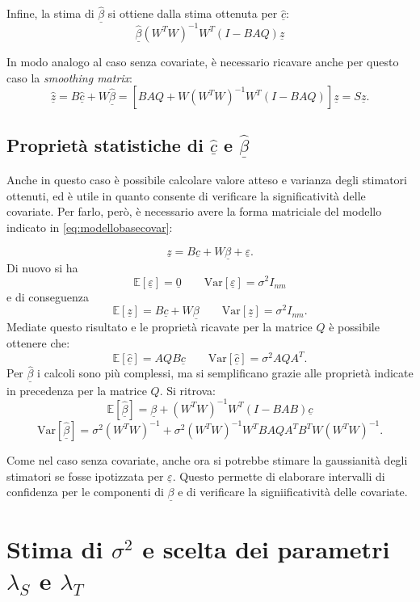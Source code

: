 \documentclass[a4paper,11pt,twoside,openright]{book}							%
\begin{document}
Infine, la stima di $\hat  {\underline \beta}$ si ottiene dalla stima ottenuta per $\hat  {\underline c}$:
$$
\hat{\underline{\beta}}(W^TW)^{-1}W^T(I-B AQ)\underline z
$$

In modo analogo al caso senza covariate, è necessario ricavare anche per questo caso la \textit{smoothing matrix}:
$$
\hat  {\underline z} =B\hat  {\underline c} + W \hat  {\underline \beta} = [B AQ + W(W^TW)^{-1}W^T(I-B AQ)]\underline z = S\underline z .
$$

\subsection{Proprietà statistiche di $\hat  {\underline c}$ e $\hat  {\underline \beta}$}
Anche in questo caso è possibile calcolare valore atteso e varianza degli stimatori ottenuti, ed è utile in quanto consente di verificare la significatività delle covariate. Per farlo, però, è necessario avere la forma matriciale del modello indicato in \ref{eq:modellobasecovar}:

\begin{equation}
\label{eq:modellobasecovarmatric}
\underline z=B \underline c + W \underline \beta + \underline \varepsilon .
\end{equation}
Di nuovo si ha 
$$
\mathbb{E}[\underline \varepsilon] = \underline 0 \qquad \mathrm{Var}[\underline \varepsilon] = \sigma^2 I_{nm}
$$
e di conseguenza
$$
\mathbb{E}[\underline z] = B \underline c + W \underline \beta \qquad \mathrm{Var}[\underline z] = \sigma^2 I_{nm} .
$$
Mediate questo risultato e le proprietà ricavate per la matrice $Q$ è possibile ottenere che:
$$
\mathbb{E}[\hat  {\underline c}] = AQB \underline c \qquad \mathrm{Var}[\hat  {\underline c}] = \sigma^2 AQA^T .
$$
Per $\hat  {\underline \beta}$ i calcoli sono più complessi, ma si semplificano grazie alle proprietà indicate in precedenza per la matrice $Q$. Si ritrova:
$$
\mathbb{E}[\hat  {\underline \beta}] = \underline \beta + (W^TW)^{-1}W^T(I-B AB)\underline c
$$
$$ \mathrm{Var}[\hat  {\underline \beta}] = \sigma^2 (W^TW)^{-1} + \sigma^2 (W^TW)^{-1}W^T B A Q A^T B^T W(W^TW)^{-1}.
$$

Come nel caso senza covariate, anche ora si potrebbe stimare la gaussianità degli stimatori se fosse ipotizzata per $\underline \varepsilon$. Questo permette di elaborare intervalli di confidenza per le componenti di $\underline \beta$ e di verificare la signiificatività delle covariate.


\section{Stima di $\sigma^2$ e scelta dei parametri $\lambda_S$ e $\lambda_T$}
\label{sez:GCV}
\end{document}
